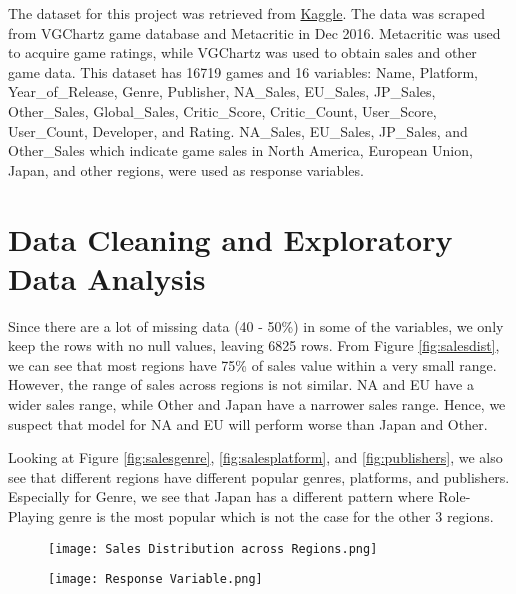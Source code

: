 \documentclass[12pt]{article}
\begin{document}
The dataset for this project was retrieved from \href{https://www.kaggle.com/datasets/rush4ratio/video-game-sales-with-ratings}{Kaggle}. The data was scraped from VGChartz game database and Metacritic in Dec 2016. Metacritic was used to acquire game ratings, while VGChartz was used to obtain sales and other game data. This dataset has 16719 games and 16 variables: Name, Platform, Year\_of\_Release, Genre, Publisher, NA\_Sales, EU\_Sales, JP\_Sales, Other\_Sales, Global\_Sales, Critic\_Score, Critic\_Count, User\_Score, User\_Count, Developer, and Rating. NA\_Sales, EU\_Sales, JP\_Sales, and  Other\_Sales which indicate game sales in North America, European Union, Japan, and other regions, were used as response variables.

\section{Data Cleaning and Exploratory Data Analysis}

Since there are a lot of missing data (40 - 50\%) in some of the variables, we only keep the rows with no null values, leaving 6825 rows. From Figure \ref{fig:salesdist}, we can see that most regions have 75\% of sales value within a very small range. However, the range of sales across regions is not similar. NA and EU have a wider sales range, while Other and Japan have a narrower sales range. Hence, we suspect that model for NA and EU will perform worse than Japan and Other. 

Looking at Figure \ref{fig:salesgenre}, \ref{fig:salesplatform}, and \ref{fig:publishers}, we also see that different regions have different popular genres, platforms, and publishers. Especially for Genre, we see that Japan has a different pattern where Role-Playing genre is the most popular which is not the case for the other 3 regions.

\begin{figure}
\centering
\begin{minipage}{.5\textwidth}
  \centering
  \texttt{[image: Sales Distribution across Regions.png]}
  \label{fig:salesdist}
\end{minipage}%
\begin{minipage}{.5\textwidth}
  \centering
  \texttt{[image: Response Variable.png]}
  \label{fig:qqsales}
\end{minipage}
\end{figure}
\end{document}
